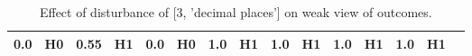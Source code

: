 \begin{table}
\begin{tabular}{l|cc|cc|cc|cc|cc|cc|cc}
\cellcolor{Bittersweet}0.0&\cellcolor{Bittersweet}H0&\cellcolor{Bittersweet}0.55&\cellcolor{Bittersweet}H1&\cellcolor{Bittersweet}0.0&\cellcolor{Bittersweet}H0&\cellcolor{Bittersweet}1.0&\cellcolor{Bittersweet}H1&\cellcolor{Bittersweet}1.0&\cellcolor{Bittersweet}H1&\cellcolor{Bittersweet}1.0&\cellcolor{Bittersweet}H1&\cellcolor{Bittersweet}1.0&\cellcolor{Bittersweet}H1\\\bottomrule\end{tabular}\caption{Effect of disturbance of [3, 'decimal places'] on weak view of outcomes.}\end{table}